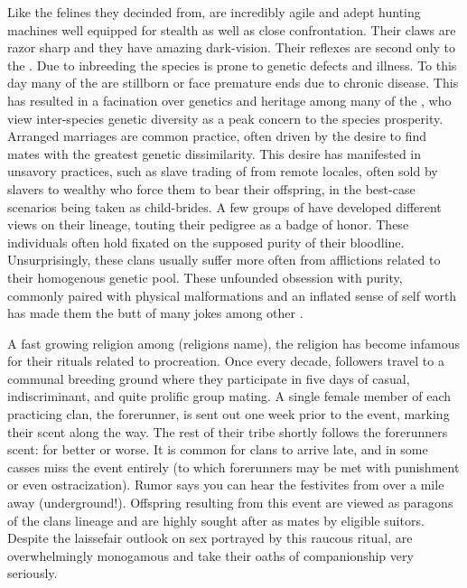 \documentclass[twoside, 12pt, letterpaper]{report}\usepackage[]{graphicx}\usepackage[]{color}
\begin{document}
\begin{multicols*}{2}
Like the felines they decinded from, \cat are incredibly agile and adept hunting machines well equipped for stealth as well as close confrontation. Their claws are razor sharp and they have amazing dark-vision. Their reflexes are second only to the \mantis. Due to inbreeding the species is prone to genetic defects and illness. To this day many of the \cat are stillborn or face premature ends due to chronic disease. This has resulted in a facination over genetics and heritage among many of the \cat, who view inter-species genetic diversity as a peak concern to the species prosperity. Arranged marriages are common practice, often driven by the desire to find mates with the greatest genetic dissimilarity. This desire has manifested in unsavory practices, such as slave trading of \cat from remote locales, often sold by \cat slavers to wealthy \cat who force them to bear their offspring, in the best-case scenarios being taken as child-brides. A few groups of \cat have developed different views on their lineage, touting their pedigree as a badge of honor. These individuals often hold fixated on the supposed purity of their bloodline. Unsurprisingly, these clans usually suffer more often from afflictions related to their homogenous genetic pool. These \cat unfounded obsession with purity, commonly paired with physical malformations and an inflated sense of self worth has made them the butt of many jokes among other \cat.

A fast growing religion among \cat (religions name), the religion has become infamous for their rituals related to procreation. Once every decade, followers travel to a communal breeding ground where they participate in five days of casual, indiscriminant, and quite prolific group mating. A single female member of each practicing clan, the forerunner, is sent out one week prior to the event, marking their scent along the way. The rest of their tribe shortly follows the forerunners scent: for better or worse. It is common for clans to arrive late, and in some casses miss the event entirely (to which forerunners may be met with punishment or even ostracization). Rumor says you can hear the festivites from over a mile away (underground!). Offspring resulting from this event are viewed as paragons of the clans lineage and are highly sought after as mates by eligible suitors. Despite the laissefair outlook on sex portrayed by this raucous ritual, \cat are overwhelmingly monogamous and take their oaths of companionship very seriously.


\end{multicols*}
\end{document}

